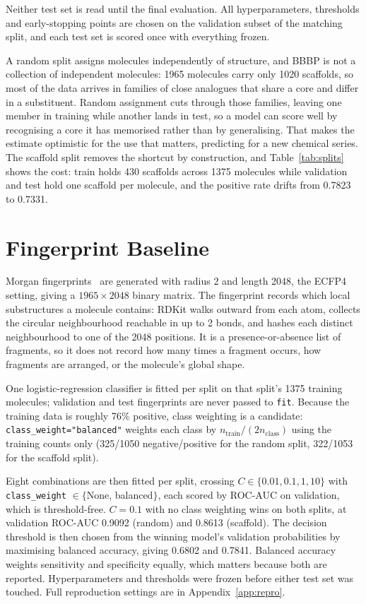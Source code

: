 \documentclass[10pt,a4paper]{article}
\begin{document}
Neither test set is read until the final evaluation. All hyperparameters, thresholds and early-stopping points are chosen on the validation subset of the matching split, and each test set is scored once with everything frozen.

A random split assigns molecules independently of structure, and BBBP is not a collection of independent molecules: 1965 molecules carry only 1020 scaffolds, so most of the data arrives in families of close analogues that share a core and differ in a substituent. Random assignment cuts through those families, leaving one member in training while another lands in test, so a model can score well by recognising a core it has memorised rather than by generalising. That makes the estimate optimistic for the use that matters, predicting for a new chemical series. The scaffold split removes the shortcut by construction, and Table~\ref{tab:splits} shows the cost: train holds 430 scaffolds across 1375 molecules while validation and test hold one scaffold per molecule, and the positive rate drifts from 0.7823 to 0.7331.

\section{Fingerprint Baseline}
Morgan fingerprints~\cite{rdkit} are generated with radius 2 and length 2048, the ECFP4 setting, giving a $1965 \times 2048$ binary matrix. The fingerprint records which local substructures a molecule contains: RDKit walks outward from each atom, collects the circular neighbourhood reachable in up to 2 bonds, and hashes each distinct neighbourhood to one of the 2048 positions. It is a presence-or-absence list of fragments, so it does not record how many times a fragment occurs, how fragments are arranged, or the molecule's global shape.

One logistic-regression classifier is fitted per split on that split's 1375 training molecules; validation and test fingerprints are never passed to \texttt{fit}. Because the training data is roughly 76\% positive, class weighting is a candidate: \texttt{class\_weight="balanced"} weights each class by $n_{\text{train}} / (2 n_{\text{class}})$ using the training counts only (325/1050 negative/positive for the random split, 322/1053 for the scaffold split).

Eight combinations are then fitted per split, crossing $C \in \{0.01, 0.1, 1, 10\}$ with \texttt{class\_weight} $\in \{$None, balanced$\}$, each scored by ROC-AUC on validation, which is threshold-free. $C = 0.1$ with no class weighting wins on both splits, at validation ROC-AUC 0.9092 (random) and 0.8613 (scaffold). The decision threshold is then chosen from the winning model's validation probabilities by maximising balanced accuracy, giving 0.6802 and 0.7841. Balanced accuracy weights sensitivity and specificity equally, which matters because both are reported. Hyperparameters and thresholds were frozen before either test set was touched. Full reproduction settings are in Appendix~\ref{app:repro}.
\end{document}

